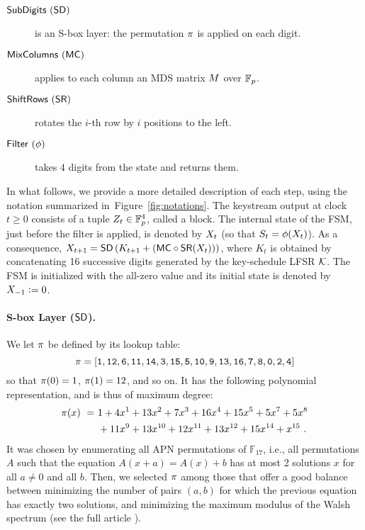 \begin{description}
\item[$\text{\textsf{SubDigits}}~(\text{\textsf{SD}})$] is an \gls{S-box} layer: the permutation $\pi$ is applied on each digit.
\item[$\text{\textsf{MixColumns}}~(\text{\textsf{MC}})$] applies to each column an MDS matrix $M$ over \(\mathbb{F}_p\).
\item[$\text{\textsf{ShiftRows}}~(\text{\textsf{SR}})$] rotates the $i$-th row by $i$ positions to the left.
\item[$\text{\textsf{Filter}}~(\mathbf{\phi})$] takes $4$ digits from the state and returns them. 
\end{description}

In what follows, we provide a more detailed description of each step, using the notation summarized in~Figure~\ref{fig:notations}. The keystream output at clock $t \geq 0$ consists of a tuple $Z_t \in \mathbb{F}_{p}^4$, called a block. The internal state of the FSM, just before the filter is applied, is denoted by $X_{t}$ (so that $S_t = \phi(X_{t})$). As a consequence, $X_{t+1} = \text{\textsf{SD}}\left(K_{t+1} + \left(\text{\textsf{MC}} \circ \text{\textsf{SR}} (X_{t})\right)\right)$, where $K_t$ is obtained by concatenating 16 successive digits generated by the key-schedule LFSR $\mathcal{K}$. The FSM is initialized with the all-zero value and its initial state is denoted by $X_{-1} \vcentcolon= 0$.







\paragraph{\gls{S-box} Layer ($\text{\textsf{SD}}$).}
We let $\pi$ be defined by its lookup table:
\begin{equation}
  \label{eq:thesbox}
  \pi = {\tt [1, 12, 6, 11, 14, 3, 15, 5, 10, 9, 13, 16, 7, 8, 0, 2, 4]}
\end{equation}
so that $\pi(0) = 1$, $\pi(1) = 12$, and so on. It has the following polynomial representation, and is thus of maximum degree: %
\begin{equation*}
  \begin{split}
    \pi(x) ~=~& 1 + 4 x^{1} + 13 x^{2} + 7 x^{3} + 16 x^{4} + 15 x^{5} + 5 x^{7} + 5 x^{8} \\
    & + 11 x^{9} + 13 x^{10} + 12 x^{11} + 13 x^{12} + 15 x^{14} + x^{15}~.
  \end{split}
\end{equation*}
It was chosen by enumerating all APN permutations of $\mathbb{F}_{17}$, i.e., all permutations $A$ such that the equation $A(x+a)=A(x)+b$ has at most 2 solutions $x$ for all $a \neq 0$ and all $b$. Then, we selected $\pi$ among those that offer a good balance between minimizing the number of pairs $(a,b)$ for which the previous equation has exactly two solutions, and minimizing the maximum modulus of the Walsh spectrum (see the full article \cite{transistor}).



